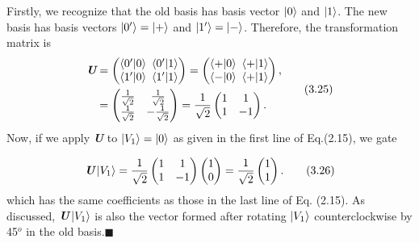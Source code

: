 \documentclass{article}
\begin{document}
Firstly, we recognize that the old basis has basis vector $\ket{0}$
and $\ket{1}$. The new basis has basis vectors $\ket{0^\prime}=\ket{+}$ and
$\ket{1^\prime}=\ket{-}$. Therefore, the transformation matrix is 
\begin{align} \label{eq 3.25}
    \begin{split}
        \textit{\textbf{U}} &= \begin{pmatrix}
            \braket{0^\prime|0} \ \braket{0^\prime|1}\\
            \braket{1^\prime|0} \ \braket{1^\prime|1}\\
        \end{pmatrix}
        =\begin{pmatrix}
        \braket{+|0} \ \braket{+|1}\\
            \braket{-|0} \ \braket{+|1}\\    
        \end{pmatrix},\\
        &=\begin{pmatrix}
            \frac{1}{\sqrt{2}} & \frac{1}{\sqrt{2}}\\
            \frac{1}{\sqrt{2}} & -\frac{1}{\sqrt{2}}\\
        \end{pmatrix}
        =\frac{1}{\sqrt{2}}\begin{pmatrix}
            1 &1 \\ 1 & -1\\
        \end{pmatrix}. 
    \end{split}\tag{3.25}
\end{align}
Now, if we apply \textit{\textbf{U}} to $\ket{V_1}=\ket{0}$ as given
in the first line of Eq.(2.15), we gate

\begin{equation} \label{eq 3.26}
    \textit{\textbf{U}}\ket{V_1}=\frac{1}{\sqrt{2}}\begin{pmatrix}
        1&1\\1&-1\\
    \end{pmatrix}
    \begin{pmatrix}
        1\\0
    \end{pmatrix}
    =\frac{1}{\sqrt{2}}\begin{pmatrix}
        1\\1
    \end{pmatrix}. \tag{3.26}
\end{equation}
which has the same coefficients as those in the last line of Eq. (2.15).
As discussed, $\textit{\textbf{U}}\ket{V_1}$ is also the vector formed after rotating 
$\ket{V_1}$ counterclockwise by 45$^o$ in the old basis.\hfill $\blacksquare$
\end{document}
